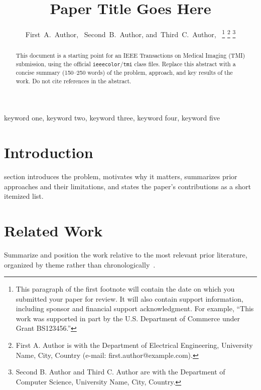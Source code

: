 \documentclass[journal,twoside,web]{ieeecolor}
\begin{document}
\title{Paper Title Goes Here}

\author{First~A.~Author,~
        Second~B.~Author,
        and~Third~C.~Author,~
\thanks{This paragraph of the first footnote will contain the date on which
    you submitted your paper for review. It will also contain support
    information, including sponsor and financial support acknowledgment.
    For example, ``This work was supported in part by the U.S. Department
    of Commerce under Grant BS123456.''}
\thanks{First A. Author is with the Department of Electrical Engineering,
    University Name, City, Country (e-mail: first.author@example.com).}
\thanks{Second B. Author and Third C. Author are with the Department of
    Computer Science, University Name, City, Country.}
}

\maketitle

\begin{abstract}
This document is a starting point for an IEEE Transactions on Medical
Imaging (TMI) submission, using the official \texttt{ieeecolor}/\texttt{tmi}
class files. Replace this abstract with a concise summary (150--250 words)
of the problem, approach, and key results of the work. Do not cite
references in the abstract.
\end{abstract}

\begin{IEEEkeywords}
keyword one, keyword two, keyword three, keyword four, keyword five
\end{IEEEkeywords}

\section{Introduction}
\label{sec:introduction}
 section introduces the problem, motivates why it
matters, summarizes prior approaches and their limitations, and states the
paper's contributions as a short itemized list.

\section{Related Work}
\label{sec:related}
Summarize and position the work relative to the most relevant prior
literature, organized by theme rather than chronologically~\cite{example2024}.
\end{document}
